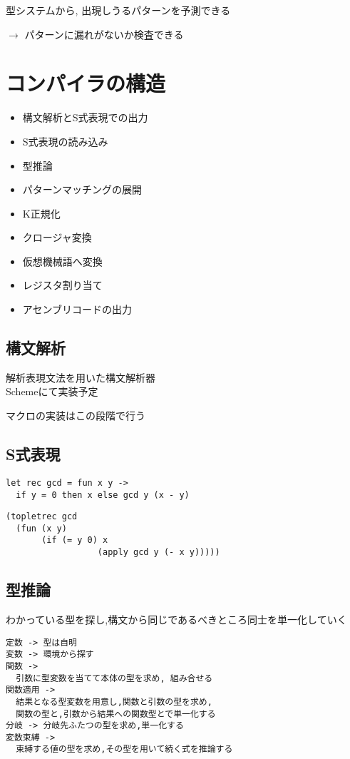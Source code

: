 \documentclass[papersize,30pt,slide]{jsarticle}
\begin{document}
型システムから, 出現しうるパターンを予測できる 

\hspace{1em} $\rightarrow$ パターンに漏れがないか検査できる

\section{コンパイラの構造}

\begin{itemize}
\item 構文解析とS式表現での出力 
\item S式表現の読み込み
\item 型推論
\item パターンマッチングの展開
\item K正規化
\item クロージャ変換
\item 仮想機械語へ変換
\item レジスタ割り当て
\item アセンブリコードの出力
\end{itemize}

\newpage

\subsection{構文解析}
解析表現文法を用いた構文解析器 \\
Schemeにて実装予定

マクロの実装はこの段階で行う

\subsection{S式表現}
\begin{verbatim}
let rec gcd = fun x y ->
  if y = 0 then x else gcd y (x - y)
\end{verbatim}

\begin{verbatim}
(topletrec gcd
  (fun (x y)
       (if (= y 0) x
                  (apply gcd y (- x y)))))
\end{verbatim}

\newpage
\subsection{型推論}
わかっている型を探し,構文から同じであるべきところ同士を単一化していく
\begin{verbatim}
定数 -> 型は自明
変数 -> 環境から探す
関数 ->
  引数に型変数を当てて本体の型を求め, 組み合せる
関数適用 ->
  結果となる型変数を用意し,関数と引数の型を求め,
  関数の型と,引数から結果への関数型とで単一化する
分岐 -> 分岐先ふたつの型を求め,単一化する
変数束縛 ->
  束縛する値の型を求め,その型を用いて続く式を推論する
\end{verbatim}
\end{document}
